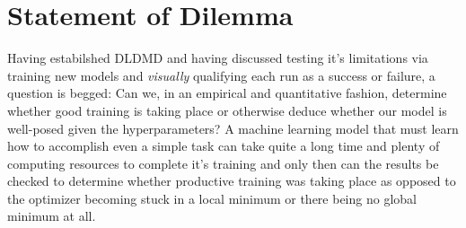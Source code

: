 \section{Statement of Dilemma}
Having estabilshed DLDMD and having discussed testing it's limitations via training 
new models and \emph{visually} qualifying each run as a success or failure, a question is 
begged: Can we, in an empirical and quantitative fashion, determine whether good training 
is taking place or otherwise deduce whether our model is well-posed given the 
hyperparameters?
A machine learning model that must learn how to accomplish even a simple task can take 
quite a long time and plenty of computing resources to complete it's training and only then 
can the results be checked to determine whether productive training was taking place as 
opposed to the optimizer becoming stuck in a local minimum or there being no global 
minimum at all.

